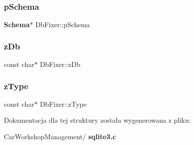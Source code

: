 \mbox{\label{struct_db_fixer_a302dd5335c8a982deda5bf04bae00363}} 
\subsubsection{pSchema}
{\footnotesize\ttfamily \textbf{ Schema}$\ast$ Db\+Fixer\+::p\+Schema}

\mbox{\label{struct_db_fixer_aba91df5965a99915d9180805d02c4a7f}} 
\subsubsection{zDb}
{\footnotesize\ttfamily const char$\ast$ Db\+Fixer\+::z\+Db}

\mbox{\label{struct_db_fixer_ae4748d9e97560b7b332527434408c2e8}} 
\subsubsection{zType}
{\footnotesize\ttfamily const char$\ast$ Db\+Fixer\+::z\+Type}



Dokumentacja dla tej struktury została wygenerowana z pliku\+:\begin{DoxyCompactItemize}
\item 
Car\+Workshop\+Management/\textbf{ sqlite3.\+c}\end{DoxyCompactItemize}

